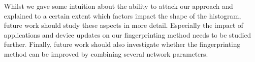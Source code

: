 \documentclass[10pt, conference, compsocconf, letterpaper]{IEEEtran}
\begin{document}
Whilst we gave some intuition about the ability to attack our approach
and explained to a certain extent which factors impact the 
shape of the histogram, future work should study these aspects in more detail. 
Especially the impact of applications and device updates on our fingerprinting method needs to be studied further.
Finally, future work should also investigate whether the fingerprinting method can be improved by combining several network parameters.



  
\end{document}
